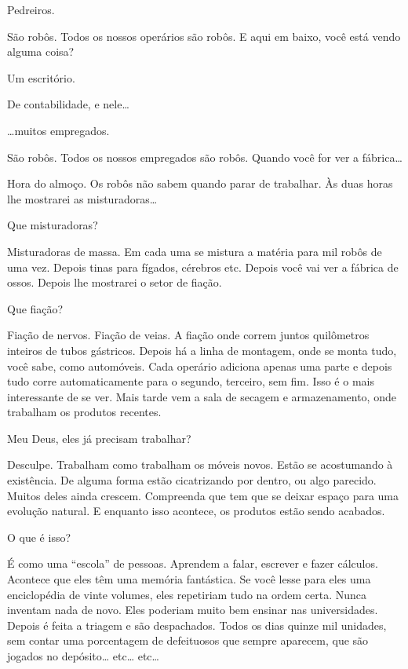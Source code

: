  Pedreiros.

 São robôs. Todos os nossos operários são robôs. E aqui em baixo, você
está vendo alguma coisa?

 Um escritório.

 De contabilidade, e nele\ldots{}

 \ldots{}muitos empregados.

 São robôs. Todos os nossos empregados são robôs. Quando você for ver a
fábrica\ldots{} 

 Hora do almoço. Os robôs não sabem quando parar de trabalhar. Às duas
horas lhe mostrarei as misturadoras\ldots{} 

 Que misturadoras?


  Misturadoras de massa. Em cada uma se mistura a
matéria para mil robôs de uma vez. Depois tinas para fígados, cérebros etc.
Depois você vai ver a fábrica de ossos. Depois lhe mostrarei o setor de fiação.

 Que fiação?

 Fiação de nervos. Fiação de veias. A fiação onde correm juntos
quilômetros inteiros de tubos gástricos. Depois há a linha de montagem, onde se monta
tudo, você sabe, como automóveis. Cada operário adiciona apenas uma parte e
depois tudo corre automaticamente para o segundo, terceiro, sem fim. Isso é o
mais interessante de se ver. Mais tarde vem a sala de secagem e armazenamento, onde
trabalham os produtos recentes.

 Meu Deus, eles já precisam trabalhar?

 Desculpe. Trabalham como trabalham os móveis novos. Estão se acostumando
à existência. De alguma forma estão cicatrizando por dentro, ou algo parecido.
Muitos deles ainda crescem. Compreenda que tem que se deixar espaço para uma
evolução natural. E enquanto isso acontece, os produtos estão sendo acabados.

 O que é isso?

 É como uma ``escola'' de pessoas. Aprendem a falar, escrever e fazer
cálculos. Acontece que eles têm uma memória fantástica. Se você lesse para eles
uma enciclopédia de vinte volumes, eles repetiriam tudo na ordem certa. Nunca
inventam nada de novo. Eles poderiam muito bem ensinar nas universidades. Depois
é feita a triagem e são despachados. Todos os dias quinze mil unidades, sem contar
uma porcentagem de defeituosos que sempre aparecem, que são jogados no
depósito\ldots{} etc\ldots{} etc\ldots{}

